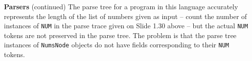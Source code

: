 \begin{minipage}[t]{\sw}
\slidenumber
\LARGE
{\bf Parsers} (continued)\exx
\emm\LightBox{\MYlonGrammarOnly}\exx
The parse tree for a program in this language
accurately represents the length
of the list of numbers given as input -- 
count the number of instances of \verb'NUM'
in the parse trace given on Slide 1.30 above --
but the actual \verb'NUM' tokens
are not preserved in the parse tree.
The problem is that the parse tree instances of \verb'NumsNode' objects
do not have fields corresponding
to their \verb'NUM' tokens.\exx
\end{minipage}
\clearpage
